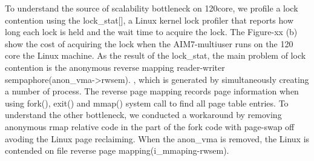 To understand the source of scalability bottleneck on 120core, we profile a lock
contention using the lock\_stat[], a Linux kernel lock profiler that reports how
long each lock is held and the wait time to acquire the lock.
The Figure-xx (b) show the cost of acquiring the lock when the AIM7-multiuser
runs on the 120 core the Linux machine.
As the result of the lock\_stat, the main problem of lock contention is the
anonymous reverse mapping reader-writer sempaphore(anon\_vma->rwsem).
, which is generated by simultaneously creating a number of process.
The reverse page mapping records page information when using fork(), exit() and
mmap() system call to find all page table entries.
To understand the other bottleneck, we conducted a workaround by removing
anonymous rmap relative code in the part of the fork code with page-swap off
avoding the Linux page reclaiming.
When the anon\_vma is removed, the Linux is contended on file reverse page
mapping(i\_mmaping-rwsem).
\fi



